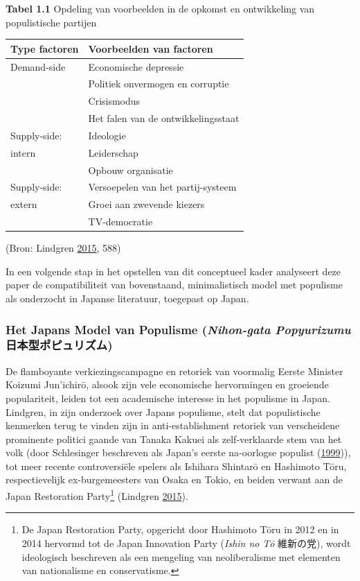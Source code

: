 \documentclass[10.5pt,dutch,]{article}
\begin{document}
\textbf{Tabel 1.1} Opdeling van voorbeelden in de opkomst en
ontwikkeling van populistische partijen

\begin{longtable}[]{@{}ll@{}}
\toprule
Type factoren & Voorbeelden van factoren\tabularnewline
\midrule
\endhead
Demand-side & Economische depressie\tabularnewline
& Politiek onvermogen en corruptie\tabularnewline
& Crisismodus\tabularnewline
& Het falen van de ontwikkelingsstaat\tabularnewline
Supply-side: & Ideologie\tabularnewline
intern & Leiderschap\tabularnewline
& Opbouw organisatie\tabularnewline
Supply-side: & Versoepelen van het partij-systeem\tabularnewline
extern & Groei aan zwevende kiezers\tabularnewline
& TV-democratie\tabularnewline
\bottomrule
\end{longtable}

(Bron: Lindgren
\protect\hyperlink{ref-lindgrenux5fdevelopingux5f2015}{2015}, 588)

In een volgende stap in het opstellen van dit conceptueel kader
analyseert deze paper de compatibiliteit van bovenstaand, minimalistisch
model met populisme als onderzocht in Japanse literatuur, toegepast op
Japan.

\subsubsection{\texorpdfstring{Het Japans Model van Populisme
(\emph{Nihon-gata Popyurizumu}
日本型ポピュリズム)}{Het Japans Model van Populisme (Nihon-gata Popyurizumu 日本型ポピュリズム)}}\label{het-japans-model-van-populisme-nihon-gata-popyurizumu-ux65e5ux672cux578bux30ddux30d4ux30e5ux30eaux30baux30e0}

De flamboyante verkiezingscampagne en retoriek van voormalig Eerste
Minister Koizumi Jun'ichirō, alsook zijn vele economische hervormingen
en groeiende populariteit, leiden tot een academische interesse in het
populisme in Japan. Lindgren, in zijn onderzoek over Japans populisme,
stelt dat populistische kenmerken terug te vinden zijn in
anti-establishment retoriek van verscheidene prominente politici gaande
van Tanaka Kakuei als zelf-verklaarde stem van het volk (door
Schlesinger beschreven als Japan's eerste na-oorlogse populist
(\protect\hyperlink{ref-schlesingerux5fshadowux5f1999}{1999})), tot meer
recente controversiële spelers als Ishihara Shintarō en Hashimoto Tōru,
respectievelijk ex-burgemeesters van Osaka en Tokio, en beiden verwant
aan de Japan Restoration Party\footnote{De Japan Restoration Party,
  opgericht door Hashimoto Tōru in 2012 en in 2014 hervormd tot de Japan
  Innovation Party (\emph{Ishin no Tō} 維新の党), wordt ideologisch
  beschreven als een mengeling van neoliberalisme met elementen van
  nationalisme en conservatisme.} (Lindgren
\protect\hyperlink{ref-lindgrenux5fdevelopingux5f2015}{2015}).
\end{document}
